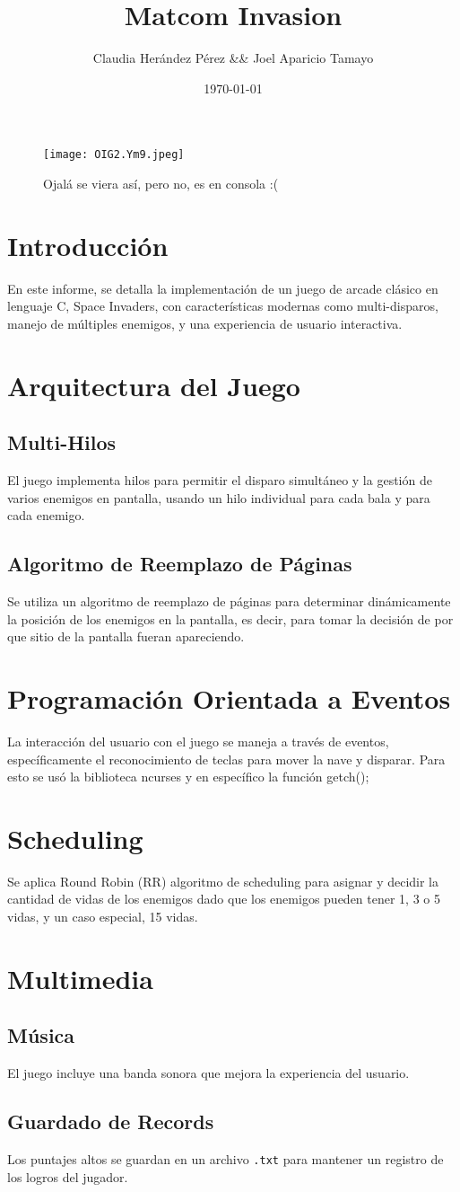 \documentclass{article}
\title{Matcom Invasion}
\author{Claudia Herández Pérez \&\& Joel Aparicio Tamayo}
\date{\today}
\begin{document}
\maketitle

\begin{figure}[h!]
    \centering
    \texttt{[image: OIG2.Ym9.jpeg]}
    \caption{Ojalá se viera así, pero no, es en consola :(}
\end{figure}

\section{Introducción}
En este informe, se detalla la implementación de un juego de arcade clásico en lenguaje C, Space Invaders, 
con características modernas como multi-disparos, manejo de múltiples enemigos, y una experiencia de usuario interactiva.

\section{Arquitectura del Juego}
\subsection{Multi-Hilos}
El juego implementa hilos para permitir el disparo simultáneo y la gestión de varios enemigos en pantalla, usando un hilo
individual para cada bala y para cada enemigo.

\subsection{Algoritmo de Reemplazo de Páginas}
Se utiliza un algoritmo de reemplazo de páginas para determinar dinámicamente la posición de los enemigos en la pantalla, 
es decir, para tomar la decisión de por que sitio de la pantalla fueran apareciendo.

\section{Programación Orientada a Eventos}
La interacción del usuario con el juego se maneja a través de eventos, específicamente el 
reconocimiento de teclas para mover la nave y disparar. Para esto se usó la biblioteca ncurses y 
en específico la función getch();

\section{Scheduling}
Se aplica Round Robin (RR) algoritmo de scheduling para asignar y decidir la cantidad de vidas de los enemigos dado que 
los enemigos pueden tener 1, 3 o 5 vidas, y un caso especial, 15 vidas.

\section{Multimedia}
\subsection{Música}
El juego incluye una banda sonora que mejora la experiencia del usuario.

\subsection{Guardado de Records}
Los puntajes altos se guardan en un archivo \texttt{.txt} para mantener un registro de los logros del jugador.
\end{document}
